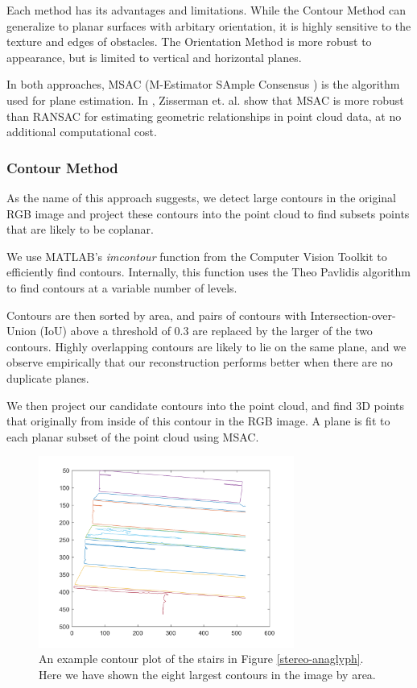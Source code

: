 Each method has its advantages and limitations. While the Contour Method can generalize to planar surfaces with arbitary orientation, it is highly sensitive to the texture and edges of obstacles. The Orientation Method is more robust to appearance, but is limited to vertical and horizontal planes.

In both approaches, MSAC (M-Estimator SAmple Consensus \cite{msac-article}) is the algorithm used for plane estimation. In \cite{msac-article}, Zisserman et. al. show that MSAC is more robust than RANSAC for estimating geometric relationships in point cloud data, at no additional computational cost.

\subsubsection{Contour Method} \label{contour-method}

As the name of this approach suggests, we detect large contours in the original RGB image and project these contours into the point cloud to find subsets points that are likely to be coplanar.

We use MATLAB's \textit{imcontour} function from the Computer Vision Toolkit to efficiently find contours. Internally, this function uses the Theo Pavlidis algorithm \cite{pavlidis} to find contours at a variable number of levels.

Contours are then sorted by area, and pairs of contours with Intersection-over-Union (IoU) above a threshold of 0.3 are replaced by the larger of the two contours. Highly overlapping contours are likely to lie on the same plane, and we observe empirically that our reconstruction performs better when there are no duplicate planes.

We then project our candidate contours into the point cloud, and find 3D points that originally from inside of this contour in the RGB image. A plane is fit to each planar subset of the point cloud using MSAC.

\begin{figure}[!h]
\centering
\includegraphics[width=3.3in]{Sections/Figures/good_contour_plot_12-7.png}
\caption{An example contour plot of the stairs in Figure \ref{stereo-anaglyph}. Here we have shown the eight largest contours in the image by area.}
\label{contours-example}
\end{figure}

